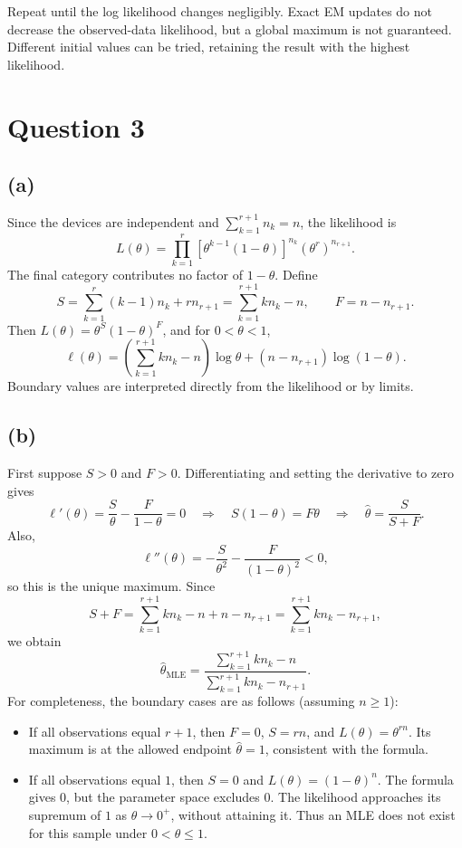 \documentclass[11pt,a4paper]{article}
\begin{document}
Repeat until the log likelihood changes negligibly. Exact EM updates do not decrease the observed-data likelihood, but a global maximum is not guaranteed. Different initial values can be tried, retaining the result with the highest likelihood.

\newpage
\section*{Question 3}
\subsection*{(a)}
Since the devices are independent and $\sum_{k=1}^{r+1}n_k=n$, the likelihood is
\[
L(\theta)=\prod_{k=1}^r\left[\theta^{k-1}(1-\theta)\right]^{n_k}
\left(\theta^r\right)^{n_{r+1}}.
\]
The final category contributes no factor of $1-\theta$. Define
\[
S=\sum_{k=1}^{r}(k-1)n_k+r n_{r+1}
=\sum_{k=1}^{r+1}kn_k-n,
\qquad F=n-n_{r+1}.
\]
Then $L(\theta)=\theta^S(1-\theta)^F$, and for $0<\theta<1$,
\[
\boxed{\ell(\theta)=
\left(\sum_{k=1}^{r+1}kn_k-n\right)\log\theta
+(n-n_{r+1})\log(1-\theta).}
\]
Boundary values are interpreted directly from the likelihood or by limits.

\subsection*{(b)}
First suppose $S>0$ and $F>0$. Differentiating and setting the derivative to zero gives
\[
\ell'(\theta)=\frac{S}{\theta}-\frac{F}{1-\theta}=0
\quad\Longrightarrow\quad
S(1-\theta)=F\theta
\quad\Longrightarrow\quad
\hat\theta=\frac{S}{S+F}.
\]
Also,
\[
\ell''(\theta)=-\frac{S}{\theta^2}-\frac{F}{(1-\theta)^2}<0,
\]
so this is the unique maximum. Since
\[
S+F=\sum_{k=1}^{r+1}kn_k-n+n-n_{r+1}
=\sum_{k=1}^{r+1}kn_k-n_{r+1},
\]
we obtain
\[
\boxed{\hat\theta_{\mathrm{MLE}}=
\frac{\displaystyle\sum_{k=1}^{r+1}kn_k-n}
{\displaystyle\sum_{k=1}^{r+1}kn_k-n_{r+1}}.}
\]
For completeness, the boundary cases are as follows (assuming $n\geq1$):
\begin{itemize}
\item If all observations equal $r+1$, then $F=0$, $S=rn$, and $L(\theta)=\theta^{rn}$. Its maximum is at the allowed endpoint $\hat\theta=1$, consistent with the formula.
\item If all observations equal $1$, then $S=0$ and $L(\theta)=(1-\theta)^n$. The formula gives $0$, but the parameter space excludes $0$. The likelihood approaches its supremum of $1$ as $\theta\to0^+$, without attaining it. Thus an MLE does not exist for this sample under $0<\theta\leq1$.
\end{itemize}
\end{document}
